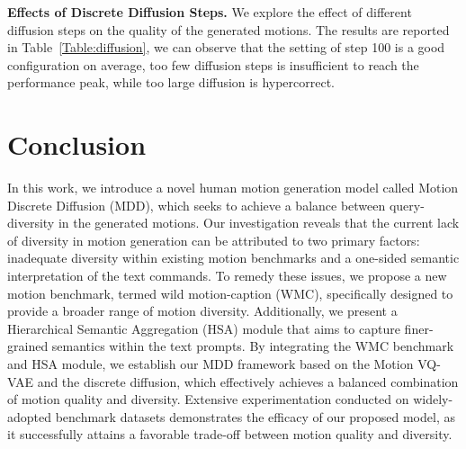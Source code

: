\documentclass[letterpaper]{article} \usepackage{aaai24}
\begin{document}
\noindent\textbf{Effects of Discrete Diffusion Steps.} We explore the effect of different diffusion steps on the quality of the generated motions. The results are reported in Table~\ref{Table:diffusion}, we can observe that the setting of step 100 is a good configuration on average, too few diffusion steps is insufficient to reach the performance peak, while too large diffusion is hypercorrect.





\section{Conclusion}
In this work, we introduce a novel human motion generation model called Motion Discrete Diffusion (MDD), which seeks to achieve a balance between query-diversity in the generated motions. Our investigation reveals that the current lack of diversity in motion generation can be attributed to two primary factors: inadequate diversity within existing motion benchmarks and a one-sided semantic interpretation of the text commands.
To remedy these issues, we propose a new motion benchmark, termed wild motion-caption (WMC), specifically designed to provide a broader range of motion diversity. Additionally, we present a Hierarchical Semantic Aggregation (HSA) module that aims to capture finer-grained semantics within the text prompts. By integrating the WMC benchmark and HSA module, we establish our MDD framework based on the Motion VQ-VAE and the discrete diffusion, which effectively achieves a balanced combination of motion quality and diversity.
Extensive experimentation conducted on widely-adopted benchmark datasets demonstrates the efficacy of our proposed model, as it successfully attains a favorable trade-off between motion quality and diversity.



\end{document}
